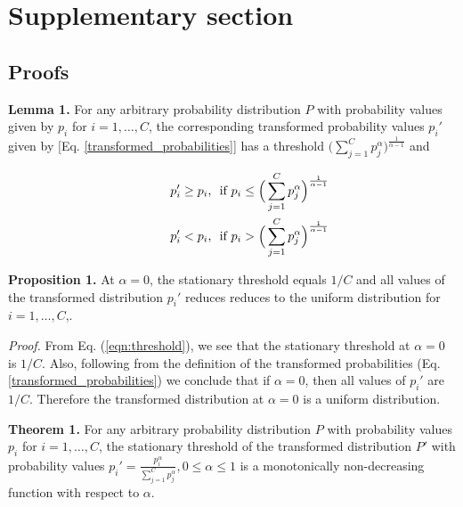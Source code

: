 \documentclass[runningheads]{llncs}
\begin{document}



\clearpage

\section{Supplementary section}
\label{sec:Supp}

\subsection{Proofs}

\textbf{Lemma 1.} For any arbitrary probability distribution $P$ with probability values
given by $p_i$ for $i=1,\dots,C$, the corresponding transformed probability values
$p_i'$ given by [Eq. \ref{transformed_probabilities}] has a threshold $\Big(\sum
_{j=1}^C p_j^{\alpha}\Big)^{\frac{1}{\alpha-1}}$ and

\begin{equation} \begin{split} p_i' \geq p_i & \text{,\ \ if } p_i \leq
\Big(\sum _{j=1}^C p_j^{\alpha }\Big)^{\frac{1}{\alpha-1}} \\ \hspace*{1cm}
p_i' < p_i & \text{,\ \ if } p_i > \Big(\sum _{j=1}^C
p_j^{\alpha}\Big)^{\frac{1}{\alpha-1}} \end{split} \label{eqn:threshold}
\end{equation}


\textbf{Proposition 1.} At $\alpha=0$, the stationary threshold equals $1/C$ and all
values of the transformed distribution $p_i'$ reduces reduces to the uniform
distribution for $i=1,\dots,C$,.

\textit{Proof.} From Eq. (\ref{eqn:threshold}), we see that the stationary threshold at
$\alpha=0$ is $1/C$. Also, following from the definition of the transformed
probabilities (Eq. \ref{transformed_probabilities}) we conclude that if $\alpha=0$, then
all values of $p_i'$ are $1/C$. Therefore the transformed distribution at $\alpha=0$ is
a uniform distribution.



\textbf{Theorem 1.} For any arbitrary probability distribution $P$ with probability
values $p_i$ for $i=1,\dots,C$, the stationary threshold of the transformed distribution
$P'$ with probability values $p_i'=\frac{p_i^{\alpha}}{\sum _{j=1}^C p_j^\alpha}, 0 \leq
\alpha \leq 1$ is a monotonically non-decreasing function with respect to $\alpha$.
\end{document}
